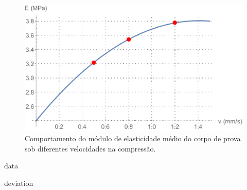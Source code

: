 \documentclass[a4paper, 12pt]{article}
\begin{document}
	\begin{figure}[h!]
		\centering
		\includegraphics[width=0.65\linewidth]{sections/images/g4}
		\caption{Comportamento do módulo de elasticidade médio do corpo de prova sob diferentes velocidades na compressão.}
		\label{fig:g4}
	\end{figure}

	{data}
	
	{deviation}
	
\end{document}
